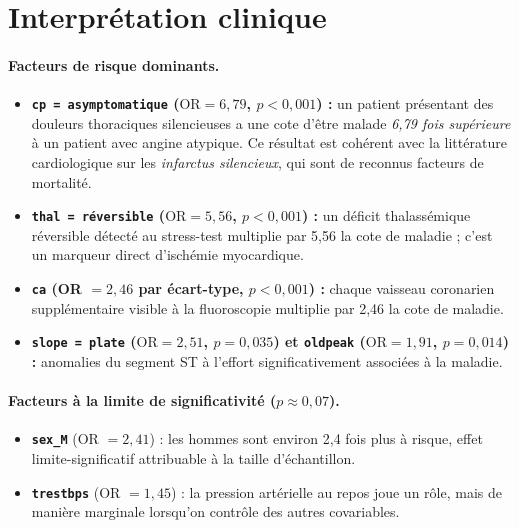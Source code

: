 \documentclass[11pt,a4paper,twoside]{report}
\newcommand{\OR}{\mathrm{OR}}
\theoremstyle{definition}
\begin{document}
\section{Interprétation clinique}

\paragraph{Facteurs de risque dominants.}
\begin{itemize}\itemsep0.3em
  \item \textbf{\texttt{cp = asymptomatique} ($\OR = 6{,}79$, $p < 0{,}001$) :}
    un patient présentant des douleurs thoraciques silencieuses a une
    cote d'être malade \emph{6,79 fois supérieure} à un patient avec
    angine atypique. Ce résultat est cohérent avec la littérature
    cardiologique sur les \emph{infarctus silencieux}, qui sont de
    reconnus facteurs de mortalité.
  \item \textbf{\texttt{thal = réversible} ($\OR = 5{,}56$, $p < 0{,}001$) :}
    un déficit thalassémique réversible détecté au stress-test
    multiplie par 5,56 la cote de maladie ; c'est un marqueur direct
    d'ischémie myocardique.
  \item \textbf{\texttt{ca} (OR $= 2{,}46$ par écart-type, $p < 0{,}001$) :}
    chaque vaisseau coronarien supplémentaire visible à la fluoroscopie
    multiplie par 2,46 la cote de maladie.
  \item \textbf{\texttt{slope = plate} ($\OR = 2{,}51$, $p = 0{,}035$)
    et \texttt{oldpeak} ($\OR = 1{,}91$, $p = 0{,}014$) :} anomalies du
    segment ST à l'effort significativement associées à la maladie.
\end{itemize}

\paragraph{Facteurs à la limite de significativité ($p \approx 0{,}07$).}
\begin{itemize}\itemsep0.2em
  \item \textbf{\texttt{sex\_M}} (OR $= 2{,}41$) : les hommes sont
    environ 2,4 fois plus à risque, effet limite-significatif attribuable
    à la taille d'échantillon.
  \item \textbf{\texttt{trestbps}} (OR $= 1{,}45$) : la pression
    artérielle au repos joue un rôle, mais de manière marginale
    lorsqu'on contrôle des autres covariables.
\end{itemize}
\end{document}
